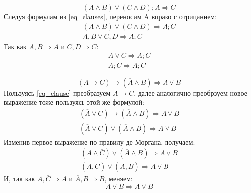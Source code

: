 \begin{task}
    \begin{equation*}
        (A \land B) \lor (C \land D); \overline A \Rightarrow C
    \end{equation*}
    Следуя формулам из \ref{eq_clauses}, переносим A вправо с отрицанием:
    \begin{gather*}
        (A \land B) \lor (C \land D) \Rightarrow A; C \\
        A, B \lor C, D \Rightarrow A; C
    \end{gather*}
    Так как $A, B \Rightarrow A$ и $C, D \Rightarrow C$:
    \begin{gather*}
        A \lor C \Rightarrow A; C \\
        A; C \Rightarrow A; C
    \end{gather*}
\end{task}

\begin{task}
    \begin{equation*}
        (A \to C) \to (\overline A \land B) \Rightarrow A \lor B
    \end{equation*}
    Пользуясь \ref{eq_clause} преобразуем $A \to C$, далее аналогично преобрзуем новое выражение
    тоже пользуясь этой же формулой:
    \begin{gather*}
        (\overline A \lor C) \to (\overline A \land B) \Rightarrow A \lor B \\
        (\overline {\overline A \lor C}) \lor (\overline A \land B) \Rightarrow A \lor B
    \end{gather*}
    Изменив первое выражение по правилу де Моргана, получаем:
    \begin{gather*}
        (A \land \overline C) \lor (\overline A \land B) \Rightarrow A \lor B \\
        (A, \overline C) \lor (\overline A, B) \Rightarrow A \lor B
    \end{gather*}
    И, так как $A, \overline C \Rightarrow A$ и $\overline A, B \Rightarrow B$, меняем:
    \begin{equation*}
        A \lor B \Rightarrow A \lor B
    \end{equation*}
\end{task}



